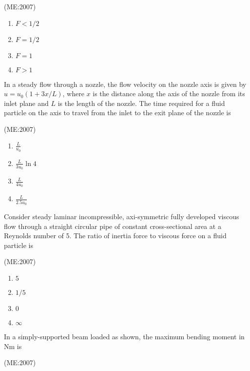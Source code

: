 	  \hfill{(ME:2007)}
	  \begin{multicols}{2}
\begin{enumerate}
    \item $F < 1/2$
    \item $F = 1/2$
    \item $F = 1$
    \item $F > 1$
\end{enumerate}
\end{multicols}

\item In a steady flow through a nozzle, the flow velocity on the nozzle axis is given by $u = u_0(1 + 3x/L)$, where $x$ is the distance along the axis of the nozzle from its inlet plane and $L$ is the length of the nozzle. The time required for a fluid particle on the axis to travel from the inlet to the exit plane of the nozzle is

           \hfill{(ME:2007)}
	   \begin{multicols}{2}
\begin{enumerate}
    \item $\frac{L}{u_0}$
    \item $\frac{L}{3 u_0} \ln 4$
    \item $\frac{L}{4 u_0}$
    \item $\frac{L}{2.5 u_0}$
\end{enumerate}
\end{multicols}

\item Consider steady laminar incompressible, axi-symmetric fully developed viscous flow through a straight circular pipe of constant cross-sectional area at a Reynolds number of 5. The ratio of inertia force to viscous force on a fluid particle is

	\hfill{(ME:2007)}
\begin{multicols}{2}
\begin{enumerate}
    \item $5$
    \item $1/5$
    \item $0$
    \item $\infty$
\end{enumerate}
\end{multicols}

\item In a simply-supported beam loaded as shown, the maximum bending moment in Nm is 

	\hfill{(ME:2007)}

